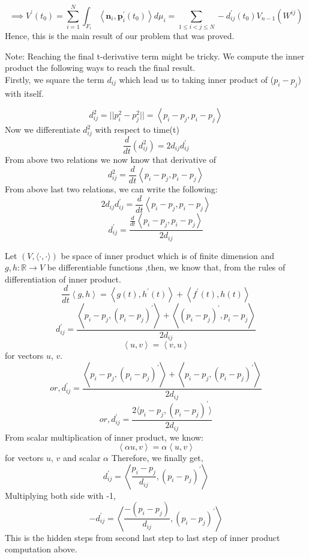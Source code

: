 $$
\implies V^{\prime}\left(t_{0}\right) =\sum_{i=1}^{N} \int_{F_{i}}\left\langle\mathbf{n}_{i}, \mathbf{p}_{i}^{\prime}\left(t_{0}\right)\right\rangle d \mu_{i} =\sum_{1 \leq i<j \leq N} -d_{i j}^{\prime}\left(t_{0}\right) V_{n-1}\left(W^{i j}\right)
$$
Hence, this is the main result of our problem that was proved.





Note: Reaching the final t-derivative term might be tricky. We compute the inner product the following ways to reach the final result.\\
Firstly, we square the term $d_{i j} $ which lead us to taking inner product of ($p_i-p_j$) with itself.

    $$d_{i j}^2 = || p_{i}^{2}- p_{j}^{2} ||= \left\langle p_i - p_j,p_i-p_j\right\rangle $$
    Now we differentiate $d_{i j}^2 $ with respect to time(t) 
    $$ 
    \frac{d}{dt}(d_{i j}^2) = 2 d_{i j} d^{'}_{i j}
    $$
From above two relations we now know that derivative of
$$d_{i j}^2  = \frac{d}{dt} \left\langle p_i-p_j, p_i -p_j \right\rangle  $$ 
From above last two relations, we can write the following:
$$
2 d_{i j} d^{'}_{i j} = \frac{d}{dt} \left\langle p_i-p_j, p_i -p_j \right\rangle 
$$
$$
d^{'}_{i j}=\frac{\frac{d}{dt} \left\langle p_i-p_j, p_i -p_j \right\rangle 
}{2 d_{i j}}
$$

Let $(V,⟨⋅,⋅⟩)$
be  space of inner product which is of finite dimension and $g,h:\mathbb{R} \rightarrow{V}$ be differentiable functions
,then, we know that, from the rules of differentiation of inner product.
$$
\frac{d}{dt}\left\langle g,h \right\rangle = \left\langle g(t) , h^{'}(t) \right\rangle + \left\langle f^{'}(t), h(t) \right\rangle
$$
$$
d^{'}_{i j}= \frac{\left\langle p_i - p_j, (p_i- p_j)^{'} \right\rangle + \left\langle (p_i - p_j)^{'},p_i-p_j\right\rangle}{2 d_{i j}}
$$
 $$\left\langle u,v \right\rangle=\left\langle v,u \right\rangle$$ for  vectors $u$, $v$. 
$$
or, d^{'}_{i j}= \frac{\left\langle p_i - p_j, (p_i- p_j)^{'} \right\rangle + \left\langle p_i-p_j, (p_i - p_j)^{'}\right\rangle}{2 d_{i j}}
$$
$$
or, d^{'}_{i j}= \frac{2 \langle p_i - p_j, (p_i- p_j)^{'} \rangle}{2 d_{i j}}
$$
From scalar multiplication of inner product, we know: $$ \left\langle \alpha u, v\right\rangle =\alpha \left\langle u,v \right\rangle $$ for  vectors $u$, $v$ and scalar $\alpha$
Therefore, we finally get,
$$
d^{'}_{i j}= \left\langle \frac{ p_i - p_j}{d_{i j}}, (p_i- p_j)^{'} \right\rangle
$$
Multiplying both side with -1,
$$
-d^{'}_{i j}= \left\langle \frac{ -(p_i - p_j)}{d_{i j}}, (p_i- p_j)^{'} \right\rangle
$$
This is the hidden steps from second last step to last step of inner product computation above.


